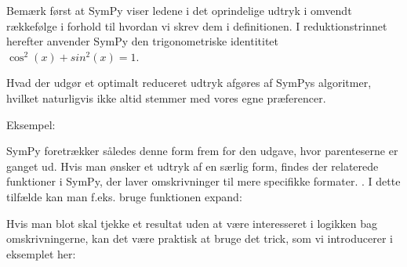 \documentclass[letterpaper,10pt,english]{jupyterBook}
\begin{document}
\noindent{}

\noindent{}

Bemærk først at SymPy viser ledene i det oprindelige udtryk i omvendt rækkefølge i forhold til hvordan vi skrev dem i definitionen. I reduktionstrinnet herefter anvender SymPy den trigonometriske identititet \(\cos^2(x) + sin^2(x) = 1\).

Hvad der udgør et optimalt reduceret udtryk afgøres af SymPys algoritmer, hvilket naturligvis ikke altid stemmer med vores egne præferencer.

Eksempel:

\begin{sphinxVerbatim}[commandchars=\\\{\}]
    
\end{sphinxVerbatim}

\noindent{}

\noindent{}

SymPy foretrækker således denne form frem for den udgave, hvor parenteserne er ganget ud.
Hvis man ønsker et udtryk af en særlig form, findes der relaterede funktioner i SymPy, der laver omskrivninger til mere specifikke formater. . I dette tilfælde kan man f.eks. bruge funktionen expand:

\begin{sphinxVerbatim}[commandchars=\\\{\}]
\end{sphinxVerbatim}

\noindent{}

Hvis man blot skal tjekke et resultat uden at være interesseret i logikken bag omskrivningerne, kan det være praktisk at bruge det trick, som vi introducerer i eksemplet her:
\end{document}
